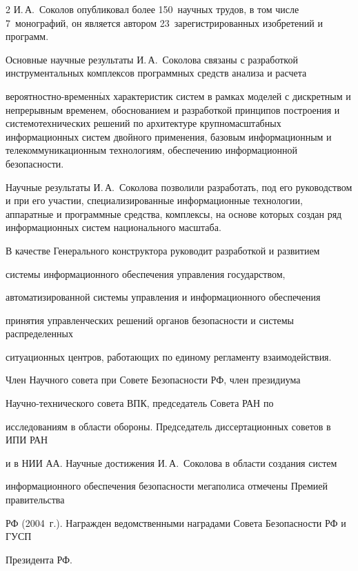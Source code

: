 \begin{multicols}{2}
И.\,А.~Соколов опубликовал более 150~научных трудов, в том числе 7~монографий, он является автором 23~зарегистрированных изобретений и программ.



Основные научные результаты И.\,А.~Соколова связаны с разработкой инструментальных комплексов программных средств анализа и расчета

вероятностно-временн$\acute{\mbox{ы}}$х характеристик систем в рамках моделей с дискретным и непрерывным временем, обоснованием и разработкой принципов построения и системотехнических решений по архитектуре крупномасштабных информационных систем двойного применения, базовым информационным и телекоммуникационным технологиям, обеспечению информационной безопасности.



Научные результаты И.\,А.~Соколова позволили разработать, под его руководством и при его участии, специализированные информационные технологии, аппаратные и программные средства, комплексы, на основе которых создан ряд информационных систем национального масштаба.



В качестве Генерального конструктора руководит разработкой и развитием

системы информа\-ци\-онного обеспечения управления государством,

автоматизированной сис\-те\-мы управ\-ле\-ния и информационного обеспечения

принятия управленческих решений органов безопасности и системы распределенных

ситуационных центров, работа\-ющих по единому регламенту взаимодействия.

Член Научного совета при Совете Безопасности РФ, член президиума

На\-уч\-но-тех\-ни\-че\-ско\-го совета ВПК, председатель Совета РАН по

исследованиям в области обороны. Председатель диссертационных советов в ИПИ РАН

и в НИИ АА. Научные достижения И.\,А.~Соколова в области создания сис\-тем

информационного обеспечения безопасности мегаполиса отмечены Премией правительства

РФ (2004~г.). Награжден ведомственными наградами Совета Безопасности РФ и ГУСП

 Президента РФ.

 

    \thispagestyle{empty}




\end{multicols}
